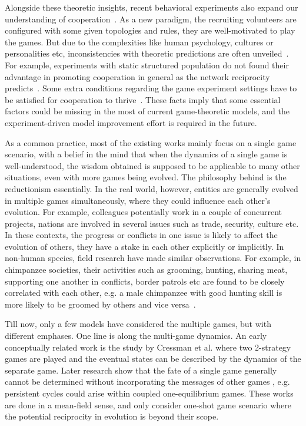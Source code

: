 \documentclass[showpacs,superscriptaddress,reprint,nofootinbib,amsmath,amssymb,aps,pre]{revtex4-1}
\begin{document}
Alongside these theoretic insights, recent behavioral experiments also expand our understanding of cooperation~\cite{Rand2013Human}. As a new paradigm, the recruiting volunteers are configured with some given topologies and rules, they are well-motivated to play the games. But due to the complexities like human psychology, cultures or personalities etc, inconsistencies with theoretic predictions are often unveiled~\cite{Dirk2012Conditional}. For example, experiments with static structured population do not found their advantage in promoting cooperation in general as the network reciprocity predicts~\cite{traulsen2010human,Carlos2012Heterogeneous,Gracial2012Human}. Some extra conditions regarding the game experiment settings have to be satisfied for cooperation to thrive~\cite{Rand2014Static}. These facts imply that some essential factors could be missing in the most of current game-theoretic models, and the experiment-driven model improvement effort is required in the future.  

As a common practice, most of the existing works mainly focus on a single game scenario, with a belief in the mind that when the dynamics of a single game is well-understood, the wisdom obtained is supposed to be applicable to many other situations, even with more games being evolved. The philosophy behind is the reductionism essentially. In the real world, however, entities are generally evolved in multiple games simultaneously, where they could influence each other's evolution. For example, colleagues potentially work in a couple of concurrent projects, nations are involved in several issues such as trade, security, culture etc. In these contexts, the progress or conflicts in one issue is likely to affect the evolution of others, they have a stake in each other explicitly or implicitly. In non-human species, field research have made similar observations. For example, in chimpanzee societies, their activities such as grooming, hunting, sharing meat, supporting one another in conflicts, border patrols etc are found to be closely correlated with each other, e.g. a male chimpanzee with good hunting skill is more likely to be groomed by others and vice versa~\cite{hammerstein2003genetic}.

Till now, only a few models have considered the multiple games, but with different emphases. One line is along the multi-game dynamics. An early conceptually related work is the study by Cressman et al. \cite{cressman2000evolutionary} where two 2-strategy games are played and the eventual states can be described by the dynamics of the separate game. 
 Later research show that the fate of a single game generally cannot be determined without incorporating the messages of other games \cite{chamberland2000example, hashimoto2006unpredictability,venkateswaran2019evolutionary}, e.g. persistent cycles could arise within coupled one-equilibrium games. These works are done in a mean-field sense, and only consider one-shot game scenario where the potential reciprocity in evolution is beyond their scope.  
 
\end{document}
